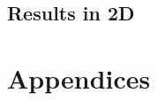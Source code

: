 \documentclass[10pt,a4paper]{article}
\begin{document}
\subsection{Results in 2D}





{}

\newpage
\appendix
\section*{\Huge{Appendices}}


%
\end{document}
